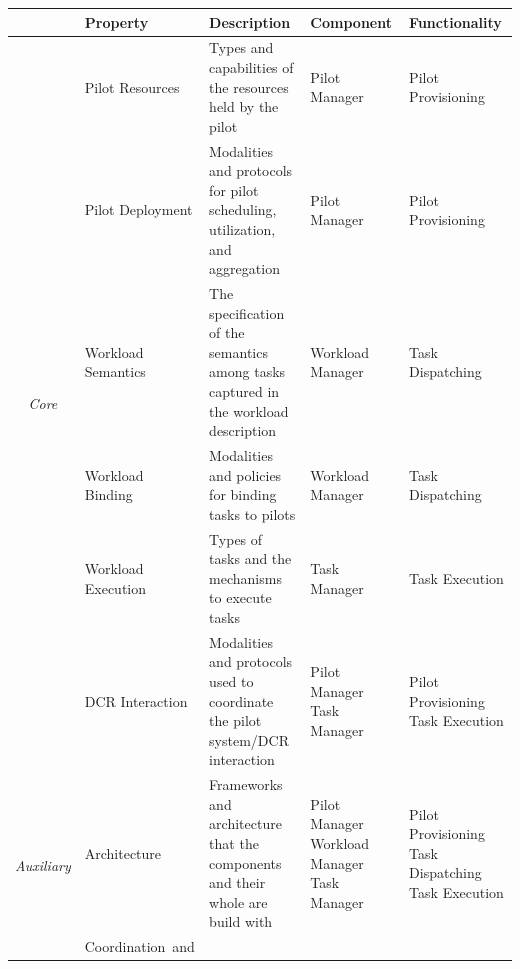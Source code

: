 \documentclass{sig-alternate}
\begin{document}
\begin{table}
\centering
\begin{tabular}{c|p{3.6cm}|p{5cm}|p{2.7cm}|p{2.7cm}|}
\cline{2-5}
                       &
\textbf{Property}      &
\textbf{Description}   &
\textbf{Component}     &
\textbf{Functionality} \\
\hline
\multirow{6}{*}{\textit{Core}}  &
Pilot Resources                 &
Types and capabilities of the resources held by the pilot &
Pilot Manager                   &
Pilot Provisioning              \\
\cline{2-5}
                                &
Pilot Deployment                &
Modalities and protocols for pilot scheduling, utilization, and aggregation &
Pilot Manager                   &
Pilot Provisioning \\
\cline{2-5}
                                &
Workload Semantics              &
The specification of the semantics among tasks captured in the workload
description &
Workload Manager                &
Task Dispatching \\
\cline{2-5}
                                &
Workload Binding                &
Modalities and policies for binding tasks to pilots &
Workload Manager                &
Task Dispatching \\
\cline{2-5}
                                &
Workload Execution              &
Types of tasks and the mechanisms to execute tasks &
Task Manager                    &
Task Execution \\
\cline{2-5}
                                &
DCR Interaction                 &
Modalities and protocols used to coordinate the pilot system/DCR interaction &
Pilot Manager      \newline
  Task Manager                  &
Pilot Provisioning \newline
  Task Execution \\
\hline
\multirow{10}{*}{\textit{Auxiliary}} &
Architecture                         &
Frameworks and architecture that the components and their whole are build
with &
Pilot Manager      \newline
  Workload Manager \newline
  Task Manager                       &
Pilot Provisioning \newline
  Task Dispatching \newline
  Task Execution \\
\cline{2-5}
                                     &
Coordination~and   \newline

\end{tabular}
\end{table}
\end{document}
